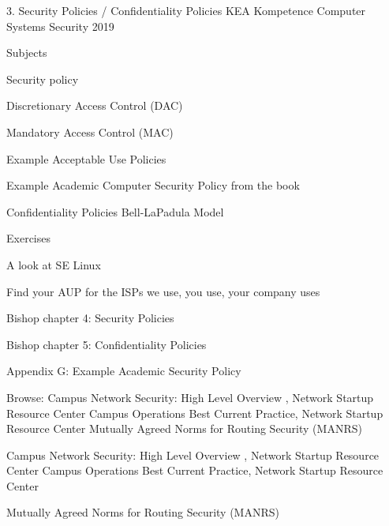 \documentclass[Screen16to9,17pt]{foils}
\begin{document}
\mytitlepage
{3. Security Policies / Confidentiality Policies}
{KEA Kompetence Computer Systems Security 2019}



\begin{list1}
\item Subjects
\begin{list2}
  \item Security policy
  \item Discretionary Access Control (DAC)
  \item Mandatory Access Control (MAC)
  \item Example Acceptable Use Policies
  \item Example Academic Computer Security Policy from the book
  \item Confidentiality Policies Bell-LaPadula Model
\end{list2}
\item Exercises
\begin{list2}
\item A look at SE Linux
\item Find your AUP for the ISPs we use, you use, your company uses
\end{list2}
\end{list1}


\begin{list1}
\item Bishop chapter 4: Security Policies
\item Bishop chapter 5: Confidentiality Policies
\item Appendix G: Example Academic Security Policy
\item Browse: Campus Network Security: High Level Overview , Network Startup Resource Center Campus Operations Best Current Practice, Network Startup Resource Center Mutually Agreed Norms for Routing Security (MANRS)
\end{list1}















 Campus Network Security: High Level Overview , Network Startup Resource Center Campus Operations Best Current Practice, Network Startup Resource Center


 Mutually Agreed Norms for Routing Security (MANRS)




\slidenext
\end{document}
